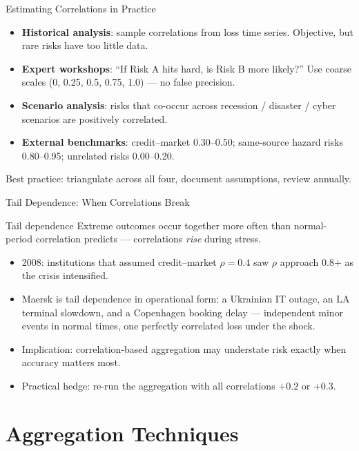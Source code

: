 \documentclass[11pt, aspectratio=169]{beamer}
\begin{document}
\begin{frame}{Estimating Correlations in Practice}
\begin{itemize}
  \item \textbf{Historical analysis}: sample correlations from loss time series. Objective, but rare risks have too little data.
  \item \textbf{Expert workshops}: ``If Risk A hits hard, is Risk B more likely?'' Use coarse scales (0, 0.25, 0.5, 0.75, 1.0) --- no false precision.
  \item \textbf{Scenario analysis}: risks that co-occur across recession / disaster / cyber scenarios are positively correlated.
  \item \textbf{External benchmarks}: credit--market 0.30--0.50; same-source hazard risks 0.80--0.95; unrelated risks 0.00--0.20.
\end{itemize}
\medskip
Best practice: \alert{triangulate} across all four, document assumptions, review annually.
\end{frame}

\begin{frame}{Tail Dependence: When Correlations Break}
\begin{block}{Tail dependence}
Extreme outcomes occur together more often than normal-period correlation predicts --- correlations \emph{rise} during stress.
\end{block}
\medskip
\begin{itemize}
  \item 2008: institutions that assumed credit--market $\rho = 0.4$ saw $\rho$ approach 0.8+ as the crisis intensified.
  \item Maersk is tail dependence in operational form: a Ukrainian IT outage, an LA terminal slowdown, and a Copenhagen booking delay --- independent minor events in normal times, one perfectly correlated loss under the shock.
  \item Implication: correlation-based aggregation may \alert{understate risk exactly when accuracy matters most}.
  \item Practical hedge: re-run the aggregation with all correlations $+0.2$ or $+0.3$.
\end{itemize}
\end{frame}

\section{Aggregation Techniques}
\end{document}
